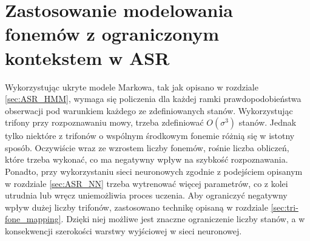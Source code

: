 \documentclass[shortabstract, mgr]{iithesis}
\begin{document}
\section{ Zastosowanie modelowania fonemów z ograniczonym kontekstem w ASR }	
	Wykorzystując ukryte modele Markowa, tak jak opisano w rozdziale \ref{sec:ASR_HMM}, wymaga się policzenia dla każdej ramki prawdopodobieństwa obserwacji pod warunkiem każdego ze zdefiniowanych stanów. Wykorzystując trifony przy rozpoznawaniu mowy, trzeba zdefiniować $O(\sigma^3)$ stanów. Jednak tylko niektóre z trifonów o wspólnym środkowym fonemie różnią się w istotny sposób. Oczywiście wraz ze wzrostem liczby fonemów, rośnie liczba obliczeń, które trzeba wykonać, co ma negatywny wpływ na szybkość rozpoznawania. Ponadto, przy wykorzystaniu sieci neuronowych zgodnie z podejściem opisanym w rozdziale \ref{sec:ASR_NN} trzeba wytrenować więcej parametrów, co z kolei utrudnia lub wręcz uniemożliwia proces uczenia. Aby ograniczyć negatywny wpływ dużej liczby trifonów, zastosowano technikę opisaną w rozdziale \ref{sec:tri-fone_mapping}. Dzięki niej możliwe jest znaczne ograniczenie liczby stanów, a w konsekwencji szerokości warstwy wyjściowej w sieci neuronowej.
	
\end{document}
